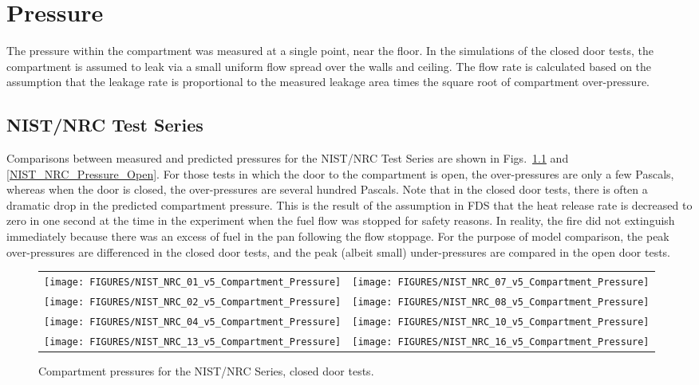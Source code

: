 \chapter{Pressure}

The pressure within the compartment was measured at a single point, near the floor.
In the simulations of the closed door tests, the compartment is assumed to leak via a small uniform flow spread
over the walls and ceiling.  The flow rate is calculated based on the assumption that the leakage rate is proportional
to the measured leakage area times the square root of compartment over-pressure.


\section{NIST/NRC Test Series}

Comparisons between measured and predicted pressures for the NIST/NRC Test Series are shown
in Figs.~\ref{NIST_NRC_Pressure_Closed} and \ref{NIST_NRC_Pressure_Open}.
For those tests in which the door to the compartment is
open, the over-pressures are only a few Pascals, whereas when the door is closed, the over-pressures are several hundred Pascals.
Note that in the closed door tests, there is often a dramatic drop in the predicted compartment pressure.
This is the result of the assumption in FDS that the heat release rate is decreased to zero in one second at the time
in the experiment when the fuel flow was stopped for safety reasons.  In reality, the fire did not extinguish
immediately because there was an excess of fuel in the pan following the flow stoppage.
For the purpose of model comparison, the peak over-pressures are differenced in the closed door tests,
and the peak (albeit small) under-pressures are compared in the open door tests.



\begin{figure}[p]
\begin{tabular*}{\textwidth}{l@{\extracolsep{\fill}}r}
\texttt{[image: FIGURES/NIST\_NRC\_01\_v5\_Compartment\_Pressure]} &
\texttt{[image: FIGURES/NIST\_NRC\_07\_v5\_Compartment\_Pressure]} \\
\texttt{[image: FIGURES/NIST\_NRC\_02\_v5\_Compartment\_Pressure]} &
\texttt{[image: FIGURES/NIST\_NRC\_08\_v5\_Compartment\_Pressure]} \\
\texttt{[image: FIGURES/NIST\_NRC\_04\_v5\_Compartment\_Pressure]} &
\texttt{[image: FIGURES/NIST\_NRC\_10\_v5\_Compartment\_Pressure]} \\
\texttt{[image: FIGURES/NIST\_NRC\_13\_v5\_Compartment\_Pressure]} &
\texttt{[image: FIGURES/NIST\_NRC\_16\_v5\_Compartment\_Pressure]}
\end{tabular*}
\caption{Compartment pressures for the NIST/NRC Series, closed door tests.}
\label{NIST_NRC_Pressure_Closed}
\end{figure}

